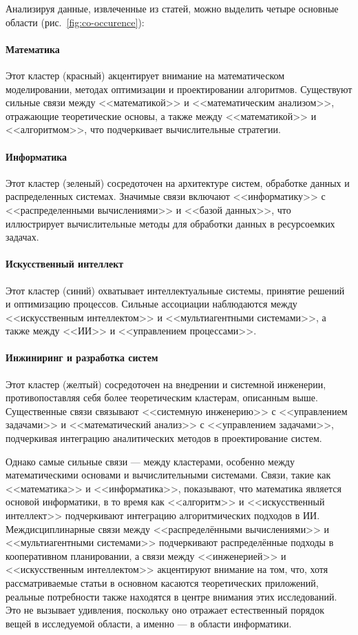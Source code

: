 \documentclass[%
]{ittmm}
\begin{document}
Анализируя данные, извлеченные из статей, можно выделить четыре основные области (рис.~\ref{fig:co-occurence}):

\paragraph{Математика}

Этот кластер (красный) акцентирует внимание на математическом моделировании, методах оптимизации и проектировании алгоритмов.
Существуют сильные связи между <<математикой>> и <<математическим анализом>>,
отражающие теоретические основы, а также между <<математикой>> и <<алгоритмом>>, что подчеркивает вычислительные стратегии.

\paragraph{Информатика}

Этот кластер (зеленый) сосредоточен на архитектуре систем, обработке данных и распределенных системах.
Значимые связи включают <<информатику>> с <<распределенными вычислениями>> и <<базой данных>>,
что иллюстрирует вычислительные методы для обработки данных в ресурсоемких задачах.

\paragraph{Искусственный интеллект}

Этот кластер (синий) охватывает интеллектуальные системы, принятие решений и оптимизацию процессов.
Сильные ассоциации наблюдаются между <<искусственным интеллектом>> и <<мультиагентными системами>>,
а также между <<ИИ>> и <<управлением процессами>>.

\paragraph{Инжиниринг и разработка систем}

Этот кластер (желтый) сосредоточен на внедрении и системной инженерии,
противопоставляя себя более теоретическим кластерам, описанным выше.
Существенные связи связывают <<системную инженерию>> с <<управлением задачами>> и <<математический анализ>> с <<управлением задачами>>,
подчеркивая интеграцию аналитических методов в проектирование систем.

Однако самые сильные связи --- между кластерами, особенно между математическими основами и вычислительными системами.
Связи, такие как <<математика>> и <<информатика>>, показывают, что математика является основой информатики,
в то время как <<алгоритм>> и <<искусственный интеллект>> подчеркивают интеграцию алгоритмических подходов в ИИ.
Междисциплинарные связи между <<распределёнными вычислениями>> и <<мультиагентными системами>> подчеркивают распределённые подходы в кооперативном планировании,
а связи между <<инженерией>> и <<искусственным интеллектом>> акцентируют внимание на том,
что, хотя рассматриваемые статьи в основном касаются теоретических приложений,
реальные потребности также находятся в центре внимания этих исследований.
Это не вызывает удивления,
поскольку оно отражает естественный порядок вещей в исследуемой области,
а именно — в области информатики.
\end{document}
